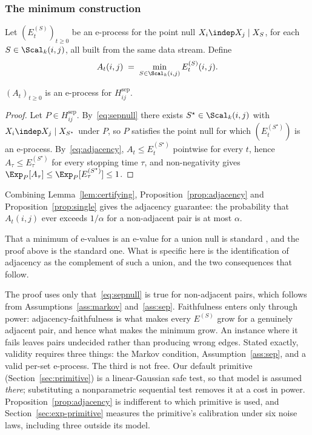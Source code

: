 \subsubsection{The minimum construction}\label{sec:minconstruction}

Let $(E^{(S)}_t)_{t \ge 0}$ be an e-process for the point null
$X_i \indep X_j \mid X_S$, for each $S \in \Scal_k(i,j)$, all built from the
same data stream. Define
\begin{equation}\label{eq:adjacency}
A_t(i,j) \;=\; \min_{S \in \Scal_k(i,j)} E^{(S)}_t(i,j) .
\end{equation}

\begin{proposition}\label{prop:adjacency}
$(A_t)_{t \ge 0}$ is an e-process for $H^{\mathrm{sep}}_{ij}$.
\end{proposition}

\begin{proof}
Let $P \in H^{\mathrm{sep}}_{ij}$. By~\eqref{eq:sepnull} there exists
$S^\star \in \Scal_k(i,j)$ with $X_i \indep X_j \mid X_{S^\star}$ under $P$,
so $P$ satisfies the point null for which $(E^{(S^\star)}_t)$ is an e-process.
By~\eqref{eq:adjacency}, $A_t \le E^{(S^\star)}_t$ pointwise for every $t$,
hence $A_\tau \le E^{(S^\star)}_\tau$ for every stopping time $\tau$, and
non-negativity gives
$\Exp_P[A_\tau] \le \Exp_P[E^{(S^\star)}_\tau] \le 1$.
\end{proof}

Combining Lemma~\ref{lem:certifying}, Proposition~\ref{prop:adjacency} and
Proposition~\ref{prop:single} gives the adjacency guarantee: the probability
that $A_t(i,j)$ ever exceeds $1/\alpha$ for a non-adjacent pair is at most
$\alpha$.

That a minimum of e-values is an e-value for a union null is standard
\citep{vovk2021evalues}, and the proof above is the standard one. What is
specific here is the identification of adjacency as the complement of such a
union, and the two consequences that follow.

\begin{remark}[No faithfulness]\label{rem:faithfulness}
The proof uses only that~\eqref{eq:sepnull} is true for non-adjacent pairs,
which follows from Assumptions~\ref{ass:markov} and~\ref{ass:sep}.
Faithfulness enters only through power: adjacency-faithfulness
\citep{ramsey2006adjacency} is what makes every $E^{(S)}$ grow for a genuinely
adjacent pair, and hence what makes the minimum grow. An instance where it
fails leaves pairs undecided rather than producing wrong edges. Stated
exactly, validity requires three things: the Markov condition,
Assumption~\ref{ass:sep}, and a valid per-set e-process. The third is not
free. Our default primitive (Section~\ref{sec:primitive}) is a linear-Gaussian
safe test, so that model is assumed \emph{there}; substituting a nonparametric
sequential test \citep{he2026sequential} removes it at a cost in power.
Proposition~\ref{prop:adjacency} is indifferent to which primitive is used,
and Section~\ref{sec:exp-primitive} measures the primitive's calibration under
six noise laws, including three outside its model.
\end{remark}


